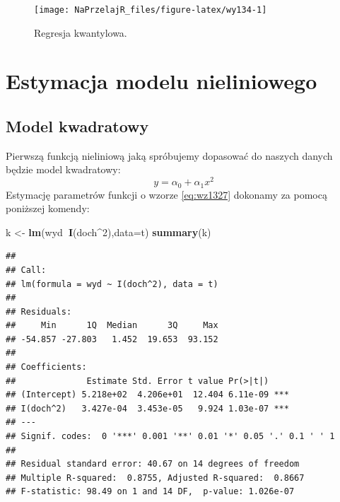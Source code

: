 \documentclass[polish,]{book}
\newenvironment{Shaded}{\begin{snugshade}}{\end{snugshade}}
\newcommand{\DataTypeTok}[1]{\textcolor[rgb]{0.13,0.29,0.53}{#1}}
\newcommand{\DecValTok}[1]{\textcolor[rgb]{0.00,0.00,0.81}{#1}}
\newcommand{\KeywordTok}[1]{\textcolor[rgb]{0.13,0.29,0.53}{\textbf{#1}}}
\newcommand{\NormalTok}[1]{#1}
\newcommand{\OperatorTok}[1]{\textcolor[rgb]{0.81,0.36,0.00}{\textbf{#1}}}
\newcommand{\StringTok}[1]{\textcolor[rgb]{0.31,0.60,0.02}{#1}}
\begin{document}
\begin{figure}[h]

{\centering \texttt{[image: NaPrzelajR\_files/figure-latex/wy134-1]} 

}

\caption{Regresja kwantylowa.}\label{fig:wy134}
\end{figure}

\hypertarget{part_13.3}{%
\section{Estymacja modelu nieliniowego}\label{part_13.3}}

\hypertarget{part_13.3.1}{%
\subsection{Model kwadratowy}\label{part_13.3.1}}

Pierwszą funkcją nieliniową jaką spróbujemy dopasować do naszych danych będzie
model kwadratowy:
\begin{equation}
y=\alpha_0+\alpha_1x^2
\label{eq:wz1327}
\end{equation}
Estymację parametrów funkcji o wzorze \eqref{eq:wz1327} dokonamy za pomocą poniższej komendy:

\begin{Shaded}
\begin{Highlighting}[]
\NormalTok{k <-}\StringTok{ }\KeywordTok{lm}\NormalTok{(wyd}\OperatorTok{~}\KeywordTok{I}\NormalTok{(doch}\OperatorTok{^}\DecValTok{2}\NormalTok{),}\DataTypeTok{data=}\NormalTok{t)}
\KeywordTok{summary}\NormalTok{(k)}
\end{Highlighting}
\end{Shaded}

\begin{verbatim}
## 
## Call:
## lm(formula = wyd ~ I(doch^2), data = t)
## 
## Residuals:
##     Min      1Q  Median      3Q     Max 
## -54.857 -27.803   1.452  19.653  93.152 
## 
## Coefficients:
##              Estimate Std. Error t value Pr(>|t|)    
## (Intercept) 5.218e+02  4.206e+01  12.404 6.11e-09 ***
## I(doch^2)   3.427e-04  3.453e-05   9.924 1.03e-07 ***
## ---
## Signif. codes:  0 '***' 0.001 '**' 0.01 '*' 0.05 '.' 0.1 ' ' 1
## 
## Residual standard error: 40.67 on 14 degrees of freedom
## Multiple R-squared:  0.8755, Adjusted R-squared:  0.8667 
## F-statistic: 98.49 on 1 and 14 DF,  p-value: 1.026e-07
\end{verbatim}
\end{document}
